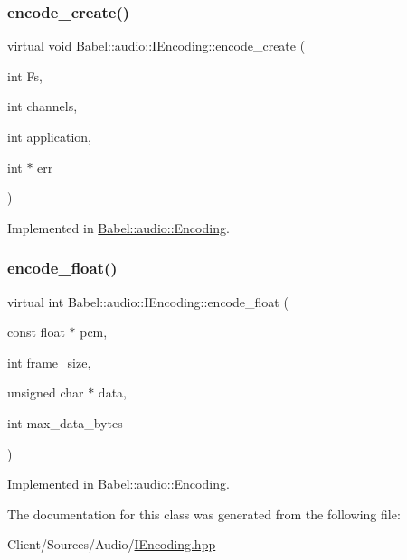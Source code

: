 \subsubsection{\texorpdfstring{encode\+\_\+create()}{encode\_create()}}
{\footnotesize\ttfamily virtual void Babel\+::audio\+::\+I\+Encoding\+::encode\+\_\+create (\begin{DoxyParamCaption}\item[{int}]{Fs,  }\item[{int}]{channels,  }\item[{int}]{application,  }\item[{int $\ast$}]{err }\end{DoxyParamCaption})\hspace{0.3cm}{\ttfamily [pure virtual]}}



Implemented in \hyperlink{classBabel_1_1audio_1_1Encoding_af3f5844d5d36d9abf85c9a3d7c56b3b4}{Babel\+::audio\+::\+Encoding}.

\mbox{\label{classBabel_1_1audio_1_1IEncoding_a2b2767758f55d5b0c541ca3a28375eaf}} 
\subsubsection{\texorpdfstring{encode\+\_\+float()}{encode\_float()}}
{\footnotesize\ttfamily virtual int Babel\+::audio\+::\+I\+Encoding\+::encode\+\_\+float (\begin{DoxyParamCaption}\item[{const float $\ast$}]{pcm,  }\item[{int}]{frame\+\_\+size,  }\item[{unsigned char $\ast$}]{data,  }\item[{int}]{max\+\_\+data\+\_\+bytes }\end{DoxyParamCaption})\hspace{0.3cm}{\ttfamily [pure virtual]}}



Implemented in \hyperlink{classBabel_1_1audio_1_1Encoding_ae6c38c4a005822b519f4f819e5fcb9ff}{Babel\+::audio\+::\+Encoding}.



The documentation for this class was generated from the following file\+:\begin{DoxyCompactItemize}
\item 
Client/\+Sources/\+Audio/\hyperlink{IEncoding_8hpp}{I\+Encoding.\+hpp}\end{DoxyCompactItemize}
